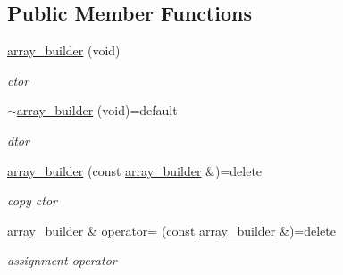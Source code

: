 \subsection*{Public Member Functions}
\begin{DoxyCompactItemize}
\item 
\mbox{\label{classcpp__redis_1_1builders_1_1array__builder_a4beae33a547d3d7efc112659411a23a3}} 
\hyperlink{classcpp__redis_1_1builders_1_1array__builder_a4beae33a547d3d7efc112659411a23a3}{array\+\_\+builder} (void)
\begin{DoxyCompactList}\small\item\em ctor \end{DoxyCompactList}\item 
\mbox{\label{classcpp__redis_1_1builders_1_1array__builder_ae6a0cd0743b6b0a21f9c3d44fd31ac17}} 
\hyperlink{classcpp__redis_1_1builders_1_1array__builder_ae6a0cd0743b6b0a21f9c3d44fd31ac17}{$\sim$array\+\_\+builder} (void)=default
\begin{DoxyCompactList}\small\item\em dtor \end{DoxyCompactList}\item 
\mbox{\label{classcpp__redis_1_1builders_1_1array__builder_aa0e5fe9a587b277a473d66b7e6db9548}} 
\hyperlink{classcpp__redis_1_1builders_1_1array__builder_aa0e5fe9a587b277a473d66b7e6db9548}{array\+\_\+builder} (const \hyperlink{classcpp__redis_1_1builders_1_1array__builder}{array\+\_\+builder} \&)=delete
\begin{DoxyCompactList}\small\item\em copy ctor \end{DoxyCompactList}\item 
\mbox{\label{classcpp__redis_1_1builders_1_1array__builder_aaa1df845df7a007cf73f95f73e800c2c}} 
\hyperlink{classcpp__redis_1_1builders_1_1array__builder}{array\+\_\+builder} \& \hyperlink{classcpp__redis_1_1builders_1_1array__builder_aaa1df845df7a007cf73f95f73e800c2c}{operator=} (const \hyperlink{classcpp__redis_1_1builders_1_1array__builder}{array\+\_\+builder} \&)=delete
\begin{DoxyCompactList}\small\item\em assignment operator \end{DoxyCompactList}\item 

\end{DoxyCompactItemize}
